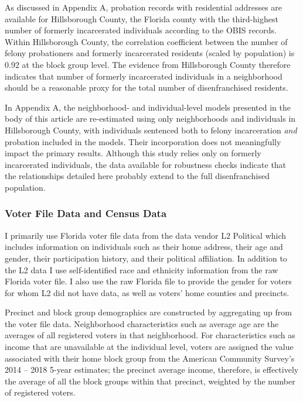 \documentclass[
  12pt,
]{article}
\begin{document}
As discussed in Appendix A, probation records with residential addresses are available for Hillsborough County, the Florida county with the third-highest number of formerly incarcerated individuals according to the OBIS records. Within Hillsborough County, the correlation coefficient between the number of felony probationers and formerly incarcerated residents (scaled by population) is 0.92 at the block group level. The evidence from Hillsborough County therefore indicates that number of formerly incarcerated individuals in a neighborhood should be a reasonable proxy for the total number of disenfranchised residents.

In Appendix A, the neighborhood- and individual-level models presented in the body of this article are re-estimated using only neighborhoods and individuals in Hillsborough County, with individuals sentenced both to felony incarceration \emph{and} probation included in the models. Their incorporation does not meaningfully impact the primary results. Although this study relies only on formerly incarcerated individuals, the data available for robustness checks indicate that the relationships detailed here probably extend to the full disenfranchised population.

\hypertarget{voter-file-data-and-census-data}{%
\subsubsection*{Voter File Data and Census Data}\label{voter-file-data-and-census-data}}

I primarily use Florida voter file data from the data vendor L2 Political which includes information on individuals such as their home address, their age and gender, their participation history, and their political affiliation. In addition to the L2 data I use self-identified race and ethnicity information from the raw Florida voter file. I also use the raw Florida file to provide the gender for voters for whom L2 did not have data, as well as voters' home counties and precincts.

Precinct and block group demographics are constructed by aggregating up from the voter file data. Neighborhood characteristics such as average age are the averages of all registered voters in that neighborhood. For characteristics such as income that are unavailable at the individual level, voters are assigned the value associated with their home block group from the American Community Survey's 2014 -- 2018 5-year estimates; the precinct average income, therefore, is effectively the average of all the block groups within that precinct, weighted by the number of registered voters.
\end{document}
